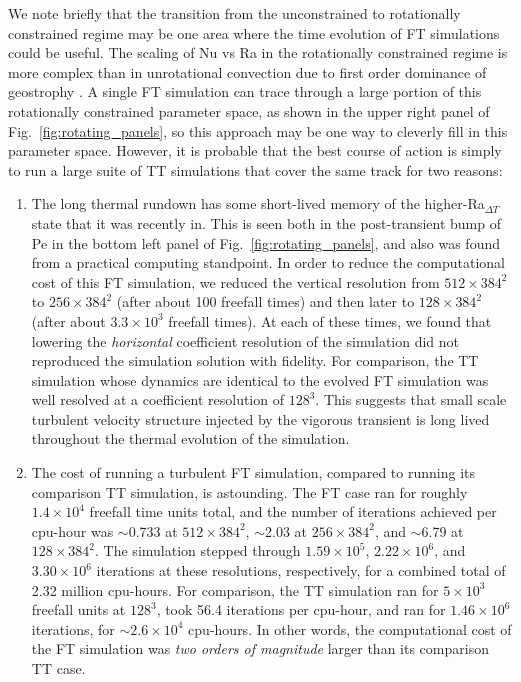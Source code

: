 \documentclass[aps, pre, onecolumn, nofootinbib, notitlepage, groupedaddress, amsfonts, amssymb, amsmath, longbibliography, superscriptaddress]{revtex4-1}
\begin{document}
We note briefly that the transition from the unconstrained to rotationally constrained regime may be one area where the time evolution of FT simulations could be useful.
The scaling of Nu vs Ra in the rotationally constrained regime is more complex than in unrotational convection due to first order dominance of geostrophy \citep{julien&all2012, plumley&julien2019}.
A single FT simulation can trace through a large portion of this rotationally constrained parameter space, as shown in the upper right panel of Fig.~\ref{fig:rotating_panels}, so this approach may be one way to cleverly fill in this parameter space.
However, it is probable that the best course of action is simply to run a large suite of TT simulations that cover the same track for two reasons:
\begin{enumerate}
\item The long thermal rundown has some short-lived memory of the higher-Ra$_{\Delta T}$ state that it was recently in.
This is seen both in the post-transient bump of Pe in the bottom left panel of Fig.~\ref{fig:rotating_panels}, and also was found from a practical computing standpoint.
In order to reduce the computational cost of this FT simulation, we reduced the vertical resolution from $512\times384^2$ to $256\times384^2$ (after about 100 freefall times) and then later to $128\times384^2$ (after about $3.3 \times 10^3$ freefall times).
At each of these times, we found that lowering the \emph{horizontal} coefficient resolution of the simulation did not reproduced the simulation solution with fidelity.
For comparison, the TT simulation whose dynamics are identical to the evolved FT simulation was well resolved at a coefficient resolution of $128^3$.
This suggests that small scale turbulent velocity structure injected by the vigorous transient is long lived throughout the thermal evolution of the simulation.
\item The cost of running a turbulent FT simulation, compared to running its comparison TT simulation, is astounding.
The FT case ran for roughly $1.4 \times 10^4$ freefall time units total, and the number of iterations achieved per cpu-hour was $\sim$0.733 at $512\times384^2$, $\sim$2.03 at $256\times384^2$, and $\sim$6.79 at $128\times384^2$.
The simulation stepped through $1.59 \times 10^5$, $2.22 \times 10^6$, and $3.30 \times 10^6$ iterations at these resolutions, respectively, for a combined total of 2.32 million cpu-hours.
For comparison, the TT simulation ran for $5 \times 10^3$ freefall units at $128^3$, took 56.4 iterations per cpu-hour, and ran for $1.46 \times 10^6$ iterations, for $\sim 2.6 \times 10^4$ cpu-hours.
In other words, the computational cost of the FT simulation was \emph{two orders of magnitude} larger than its comparison TT case.
\end{enumerate}
\end{document}
